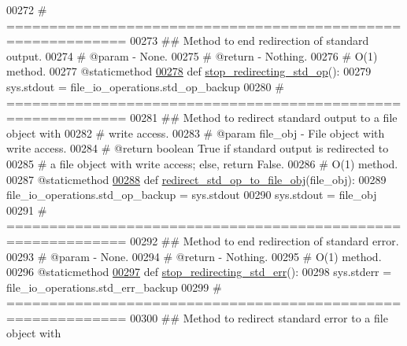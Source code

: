 \begin{DoxyCode}
00272     \textcolor{comment}{# ============================================================}
00273     \textcolor{comment}{##  Method to end redirection of standard output.}
00274     \textcolor{comment}{#   @param - None.}
00275     \textcolor{comment}{#   @return - Nothing.}
00276     \textcolor{comment}{#   O(1) method.}
00277     @staticmethod
\hypertarget{file__io_8py_source_l00278}{}\hyperlink{classutilities_1_1file__io_1_1file__io__operations_afc81e06fe5b168f0ca2baf3f3cf5f449}{00278}     \textcolor{keyword}{def }\hyperlink{classutilities_1_1file__io_1_1file__io__operations_afc81e06fe5b168f0ca2baf3f3cf5f449}{stop\_redirecting\_std\_op}():
00279         sys.stdout = file\_io\_operations.std\_op\_backup
00280     \textcolor{comment}{# ============================================================}
00281     \textcolor{comment}{##  Method to redirect standard output to a file object with}
00282     \textcolor{comment}{#       write access.}
00283     \textcolor{comment}{#   @param file\_obj - File object with write access.}
00284     \textcolor{comment}{#   @return boolean True if standard output is redirected to}
00285     \textcolor{comment}{#       a file object with write access; else, return False.}
00286     \textcolor{comment}{#   O(1) method.}
00287     @staticmethod
\hypertarget{file__io_8py_source_l00288}{}\hyperlink{classutilities_1_1file__io_1_1file__io__operations_a9ebd9b8cca3921274c4777ec7073c23f}{00288}     \textcolor{keyword}{def }\hyperlink{classutilities_1_1file__io_1_1file__io__operations_a9ebd9b8cca3921274c4777ec7073c23f}{redirect\_std\_op\_to\_file\_obj}(file\_obj):
00289         file\_io\_operations.std\_op\_backup = sys.stdout
00290         sys.stdout = file\_obj
00291     \textcolor{comment}{# ============================================================}
00292     \textcolor{comment}{##  Method to end redirection of standard error.}
00293     \textcolor{comment}{#   @param - None.}
00294     \textcolor{comment}{#   @return - Nothing.}
00295     \textcolor{comment}{#   O(1) method.}
00296     @staticmethod
\hypertarget{file__io_8py_source_l00297}{}\hyperlink{classutilities_1_1file__io_1_1file__io__operations_abc05dc3f53dc62bfe62aa316219b9807}{00297}     \textcolor{keyword}{def }\hyperlink{classutilities_1_1file__io_1_1file__io__operations_abc05dc3f53dc62bfe62aa316219b9807}{stop\_redirecting\_std\_err}():
00298         sys.stderr = file\_io\_operations.std\_err\_backup
00299     \textcolor{comment}{# ============================================================}
00300     \textcolor{comment}{##  Method to redirect standard error to a file object with}

\end{DoxyCode}
